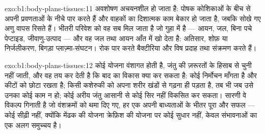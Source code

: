 \begin{solution}{exo:b1:body-plans-tissues:11}
अवशोषण अचयनशील हो जाता है: पोषक कोशिकाओं के बीच से अपनी प्रवणताओं के नीचे
पार करते हैं और वाहकों का दिशात्मक काम बेकार हो जाता है, जबकि सोखे गए अणु
वापस रिसते हैं। भीतरी परिवेश को वह सब मिल जाता है जो गुहा में है ---
आयन, जल, बिना पचे पेप्टाइड, जीवाणु-उत्पाद --- और वह जल तथा आयन आँत में
खो देता है: अतिसार, शोफ़ या निर्जलीकरण, बिगड़ा प्लाज़्मा-संघटन। रोक पार
करते बैक्टीरिया और विष प्रदाह तथा संक्रमण करते हैं।
\end{solution}

\begin{solution}{exo:b1:body-plans-tissues:12}
कोई योजना वंशागत होती है, जंतु की ज़रूरतों के हिसाब से चुनी नहीं जाती, और
वह तय कर देती है कि बाद का विकास क्या कर सकता है: कोई 
निर्मोचन माँगता है और कीटों को छोटा रखता है; किसी कशेरुकी को अपना शरीर
खंडों से गढ़ना ही पड़ता है, तब भी जब उसे उनका कोई काम न हो; कोई अरीय जंतु
आसानी से कोई सिर नहीं विकसित कर सकता। सारणी वे विकल्प गिनाती है जो
वंशक्रमों को थमा दिए गए, हर एक अपनी बाध्यताओं के भीतर पूरा और सफल ---
कोई सीढ़ी नहीं, क्योंकि मेंढक की योजना क्रेफ़िश की योजना पर कोई सुधार
नहीं, केवल संभावनाओं का एक अलग समुच्चय है।
\end{solution}

